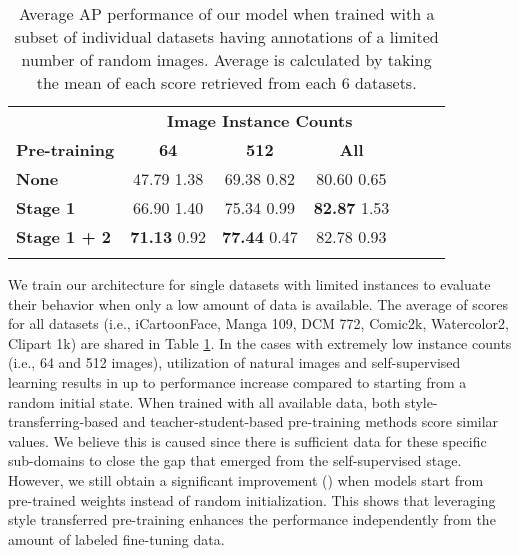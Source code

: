 \documentclass{article}
\begin{document}
\begin{table}
\centering
\begin{tabular}{l|ccccc|c}
    \hline
    \noalign{\smallskip}
    
    & \multicolumn{3}{c}{\textbf{Image Instance Counts}} \\
    
    \textbf{Pre-training} 
    & \textbf{64} 
    & \textbf{512} 
    & \textbf{All} \\
    
    \noalign{\smallskip}
    \hline
    \noalign{\smallskip}
    
    \textbf{None}  
    & 47.79 {\tiny 1.38}  
    & 69.38 {\tiny 0.82}
    & 80.60 {\tiny 0.65} \\
    
    \textbf{Stage 1} 
    & 66.90 {\tiny 1.40}
    & 75.34 {\tiny 0.99}
    & \textbf{82.87} {\tiny 1.53} \\
    
    \textbf{Stage 1 + 2} 
    & \textbf{71.13} {\tiny 0.92}
    & \textbf{77.44} {\tiny 0.47}
    & 82.78 {\tiny 0.93} \\
    
    \noalign{\smallskip}
    \hline
\end{tabular}
\caption{Average AP performance of our model when trained with a subset of individual datasets having annotations of a limited number of random images. Average is calculated by taking the mean of each score retrieved from each 6 datasets.}
\label{table:single_best_avg}
\end{table} 
We train our architecture for single datasets with limited instances to evaluate their behavior when only a low amount of data is available. The average of scores for all datasets (i.e., iCartoonFace, Manga 109, DCM 772, Comic2k, Watercolor2, Clipart 1k) are shared in Table \ref{table:single_best_avg}. In the cases with extremely low instance counts (i.e., 64 and 512 images), utilization of natural images and self-supervised learning results in up to  performance increase compared to starting from a random initial state. When trained with all available data, both style-transferring-based and teacher-student-based pre-training methods score similar values. We believe this is caused since there is sufficient data for these specific sub-domains to close the gap that emerged from the self-supervised stage. However, we still obtain a significant improvement () when models start from pre-trained weights instead of random initialization. This shows that leveraging style transferred pre-training enhances the performance independently from the amount of labeled fine-tuning data. 
\end{document}
